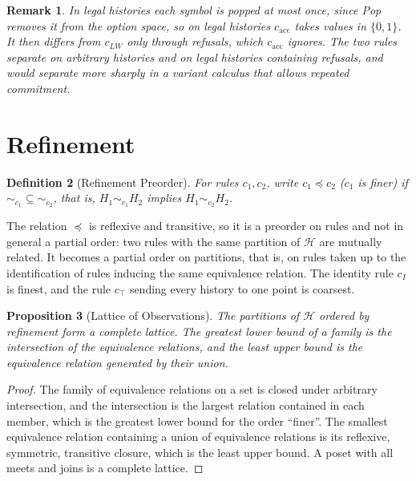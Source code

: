 \documentclass[12pt,oneside,openany]{book}
\theoremstyle{spherepop}
\newtheorem{definition}{Definition}[chapter]
\newtheorem{proposition}[definition]{Proposition}
\theoremstyle{remarkstyle}
\newtheorem{remark}[definition]{Remark}
\newcommand{\calH}{\mathcal{H}}
\begin{document}
\begin{remark}
In legal histories each symbol is popped at most once, since Pop removes it from the option space, so on legal histories $c_{\mathrm{acc}}$ takes values in $\{0,1\}$. It then differs from $c_{LW}$ only through refusals, which $c_{\mathrm{acc}}$ ignores. The two rules separate on arbitrary histories and on legal histories containing refusals, and would separate more sharply in a variant calculus that allows repeated commitment.
\end{remark}

\section{Refinement}

\begin{definition}[Refinement Preorder]
For rules $c_1,c_2$, write $c_1\preceq c_2$ ($c_1$ is \emph{finer}) if ${\sim_{c_1}}\subseteq{\sim_{c_2}}$, that is, $H_1\sim_{c_1}H_2$ implies $H_1\sim_{c_2}H_2$.
\end{definition}

The relation $\preceq$ is reflexive and transitive, so it is a preorder on rules and not in general a partial order: two rules with the same partition of $\calH$ are mutually related. It becomes a partial order on partitions, that is, on rules taken up to the identification of rules inducing the same equivalence relation. The identity rule $c_I$ is finest, and the rule $c_\top$ sending every history to one point is coarsest.

\begin{proposition}[Lattice of Observations]
\label{prop:lattice}
The partitions of $\calH$ ordered by refinement form a complete lattice. The greatest lower bound of a family is the intersection of the equivalence relations, and the least upper bound is the equivalence relation generated by their union.
\end{proposition}

\begin{proof}
The family of equivalence relations on a set is closed under arbitrary intersection, and the intersection is the largest relation contained in each member, which is the greatest lower bound for the order ``finer''. The smallest equivalence relation containing a union of equivalence relations is its reflexive, symmetric, transitive closure, which is the least upper bound. A poset with all meets and joins is a complete lattice.
\end{proof}
\end{document}
